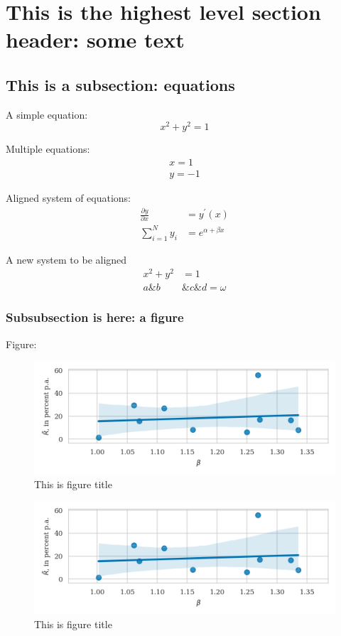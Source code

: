 \documentclass{article}
\begin{document}
\section{This is the highest level section header: some text}
\blindtext[1]

\subsection{This is a subsection: equations}
 
A simple equation:
\begin{equation}
x^2 + y^2 = 1
\end{equation}


Multiple equations:
\begin{gather}
	x = 1 \\
	y = -1
\end{gather}

Aligned system of equations:
\begin{align}
\frac{\partial y}{\partial x} &= y ^ {\prime} (x) \\
\sum\limits_{i=1}^{N}y_i &= e^{\alpha + \beta x}
\end{align}

A new system to be aligned
\begin{align}
x ^ 2 + y ^ 2 &= 1 \\
a \& b &\& c \& d = \omega
\end{align}

\subsubsection{Subsubsection is here: a figure}
Figure:


\blindtext[2]


\begin{figure}[H]
\caption{This is figure title}
\includegraphics{../../figures/beta-vs-mu.png}
\end{figure}

\blindtext[1]

\begin{figure}[H]
\caption{This is figure title}
\includegraphics{../../figures/beta-vs-mu.png}
\end{figure}
\end{document}
